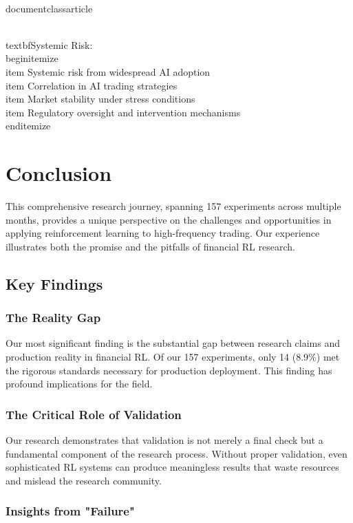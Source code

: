 \\documentclass{article}
\begin{document}
\\textbf{Systemic Risk}:
\\begin{itemize}
\\item Systemic risk from widespread AI adoption
\\item Correlation in AI trading strategies
\\item Market stability under stress conditions
\\item Regulatory oversight and intervention mechanisms
\\end{itemize}
\n\n
\section{Conclusion}

This comprehensive research journey, spanning 157 experiments across multiple months, provides a unique perspective on the challenges and opportunities in applying reinforcement learning to high-frequency trading. Our experience illustrates both the promise and the pitfalls of financial RL research.

\subsection{Key Findings}

\subsubsection{The Reality Gap}

Our most significant finding is the substantial gap between research claims and production reality in financial RL. Of our 157 experiments, only 14 (8.9\%) met the rigorous standards necessary for production deployment. This finding has profound implications for the field.

\subsubsection{The Critical Role of Validation}

Our research demonstrates that validation is not merely a final check but a fundamental component of the research process. Without proper validation, even sophisticated RL systems can produce meaningless results that waste resources and mislead the research community.

\subsubsection{Insights from "Failure"}
\end{document}
